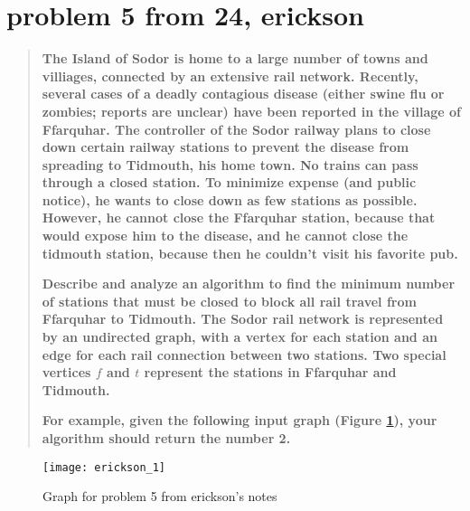 \documentclass[titlepage]{article}\usepackage[]{graphicx}\usepackage[]{color}
\begin{document}
  \section{problem 5 from 24, erickson}
  \begin{quote}
    \textbf{The Island of Sodor is home to a large number of towns and
      villiages, connected by an extensive rail network. Recently, several cases
      of a deadly contagious disease (either swine flu or zombies; reports are
      unclear) have been reported in the village of Ffarquhar. The controller of the
      Sodor railway plans to close down certain railway stations to prevent the
      disease from spreading to Tidmouth, his home town. No trains can pass through a
      closed station. To minimize expense (and public notice), he wants to close
      down as few stations as possible. However, he cannot close the Ffarquhar
      station, because that would expose him to the disease, and he cannot close the
    tidmouth station, because then he couldn't visit his favorite pub. }

    \textbf{ Describe and analyze an algorithm to find the minimum number of
      stations that must be closed to block all rail travel from Ffarquhar to
      Tidmouth. The Sodor rail network is represented by an undirected graph, with
      a vertex for each station and an edge for each rail connection between two
      stations. Two special vertices $f$ and $t$ represent the stations in
    Ffarquhar and Tidmouth.}

    \textbf{For example, given the following input graph (Figure
      \ref{fig:sodor}), your algorithm should return the number 2.}
\end{quote}

\begin{figure}
  \centering
  \texttt{[image: erickson\_1]}
  \caption{Graph for problem 5 from erickson's notes} 
  \label{fig:sodor}
  \end{figure}
\newpage
\end{document}
